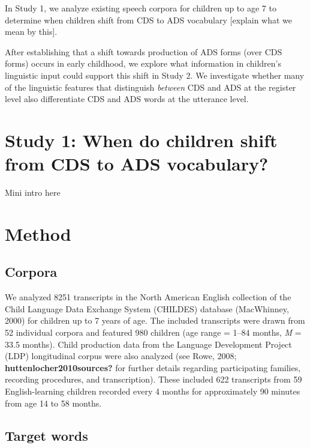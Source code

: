 \documentclass[10pt, letterpaper]{article}
\begin{document}
In Study 1, we analyze existing speech corpora for children up to age 7
to determine when children shift from CDS to ADS vocabulary {[}explain
what we mean by this{]}.

After establishing that a shift towards production of ADS forms (over
CDS forms) occurs in early childhood, we explore what information in
children's linguistic input could support this shift in Study 2. We
investigate whether many of the linguistic features that distinguish
\emph{between} CDS and ADS at the register level also differentiate CDS
and ADS words at the utterance level.

\hypertarget{study-1-when-do-children-shift-from-cds-to-ads-vocabulary}{%
\section{Study 1: When do children shift from CDS to ADS
vocabulary?}\label{study-1-when-do-children-shift-from-cds-to-ads-vocabulary}}

Mini intro here

\hypertarget{method}{%
\section{Method}\label{method}}

\hypertarget{corpora}{%
\subsection{Corpora}\label{corpora}}

We analyzed 8251 transcripts in the North American English collection of
the Child Language Data Exchange System (CHILDES) database (MacWhinney,
2000) for children up to 7 years of age. The included transcripts were
drawn from 52 individual corpora and featured 980 children (age range =
1--84 months, \emph{M} = 33.5 months). Child production data from the
Language Development Project (LDP) longitudinal corpus were also
analyzed (see Rowe, 2008; \textbf{huttenlocher2010sources?} for further
details regarding participating families, recording procedures, and
transcription). These included 622 transcripts from 59 English-learning
children recorded every 4 months for approximately 90 minutes from age
14 to 58 months.

\hypertarget{target-words}{%
\subsection{Target words}\label{target-words}}
\end{document}
